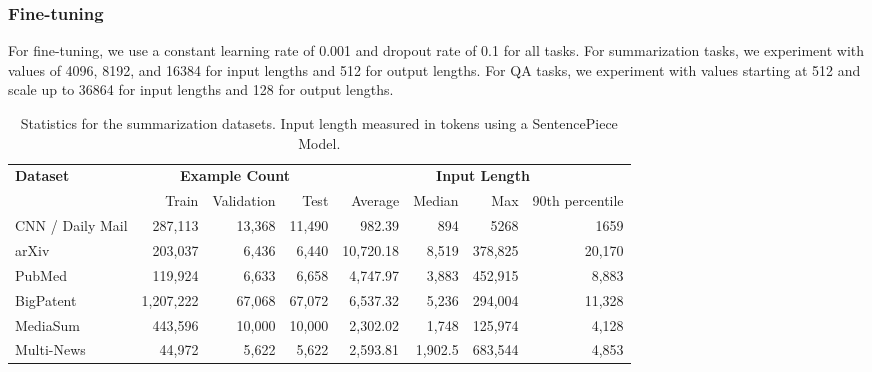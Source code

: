 \documentclass[11pt]{article}
\begin{document}
\subsubsection{Fine-tuning}
For fine-tuning, we use a constant learning rate of 0.001 and dropout rate of 0.1 for all tasks. 
For summarization tasks, we experiment with values of 4096, 8192, and 16384 for input lengths and 512 for output lengths.
For QA tasks, we experiment with values starting at 512 and scale up to 36864 for input lengths and 128 for output lengths.



\begin{table*}\small
    \centering
    \begin{tabular}{ p{2.45cm} | r r r | r r r r } \toprule
    \multirow{2}{*}{\textbf{Dataset}} & \multicolumn{3}{c}{\textbf{Example Count}} & \multicolumn{4}{c}{\textbf{Input Length}}  \\ 
    & Train & Validation & Test & Average & Median & Max & 90th percentile \\ \midrule
    CNN / Daily Mail      & 287,113 & 13,368 & 11,490  & 982.39 & 894 & 5268 & 1659 \\
    arXiv      & 203,037 & 6,436 & 6,440 & 10,720.18 & 8,519 & 378,825 & 20,170 \\
    PubMed  & 119,924 & 6,633 & 6,658 & 4,747.97 & 3,883 & 452,915 & 8,883 \\
    BigPatent   & 1,207,222 & 67,068 & 67,072 & 6,537.32 & 5,236 & 294,004 & 11,328\\
    MediaSum    & 443,596  & 10,000 & 10,000 & 2,302.02 & 1,748 & 125,974 & 4,128 \\
    Multi-News   & 44,972 & 5,622 & 5,622 & 2,593.81 & 1,902.5 & 683,544 & 4,853\\
    \bottomrule
    \end{tabular}
    \caption{Statistics for the summarization datasets. Input length measured in tokens using a SentencePiece Model.}
    \label{tab:summarization_stats}
\end{table*}
\end{document}

